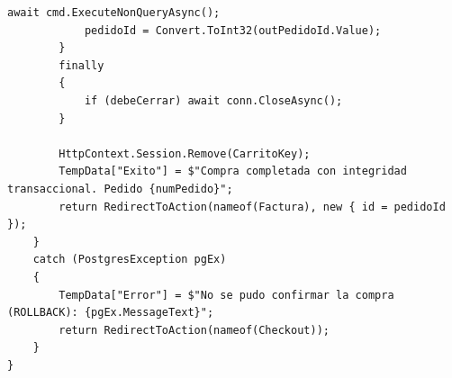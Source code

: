 \begin{lstlisting}[language={[Sharp]C}, caption={Invocacion real de CALL ventas.sp\_confirmar\_venta en TiendaController.cs}, label=lst:tienda-sp]
            await cmd.ExecuteNonQueryAsync();
            pedidoId = Convert.ToInt32(outPedidoId.Value);
        }
        finally
        {
            if (debeCerrar) await conn.CloseAsync();
        }

        HttpContext.Session.Remove(CarritoKey);
        TempData["Exito"] = $"Compra completada con integridad transaccional. Pedido {numPedido}";
        return RedirectToAction(nameof(Factura), new { id = pedidoId });
    }
    catch (PostgresException pgEx)
    {
        TempData["Error"] = $"No se pudo confirmar la compra (ROLLBACK): {pgEx.MessageText}";
        return RedirectToAction(nameof(Checkout));
    }
}
\end{lstlisting}
